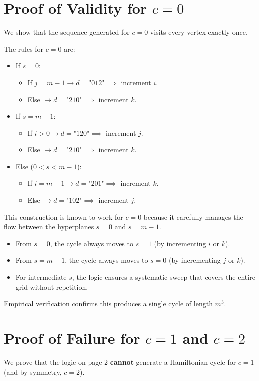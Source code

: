 \documentclass[12pt]{article}
\begin{document}
\section{Proof of Validity for $c=0$}
We show that the sequence generated for $c=0$ visits every vertex exactly once.

The rules for $c=0$ are:
\begin{itemize}
    \item If $s=0$:
    \begin{itemize}
        \item If $j=m-1 \to d=\text{"012"} \implies$ increment $i$.
        \item Else $\to d=\text{"210"} \implies$ increment $k$.
    \end{itemize}
    \item If $s=m-1$:
    \begin{itemize}
        \item If $i>0 \to d=\text{"120"} \implies$ increment $j$.
        \item Else $\to d=\text{"210"} \implies$ increment $k$.
    \end{itemize}
    \item Else ($0 < s < m-1$):
    \begin{itemize}
        \item If $i=m-1 \to d=\text{"201"} \implies$ increment $k$.
        \item Else $\to d=\text{"102"} \implies$ increment $j$.
    \end{itemize}
\end{itemize}

This construction is known to work for $c=0$ because it carefully manages the flow between the hyperplanes $s=0$ and $s=m-1$.
\begin{itemize}
    \item From $s=0$, the cycle always moves to $s=1$ (by incrementing $i$ or $k$).
    \item From $s=m-1$, the cycle always moves to $s=0$ (by incrementing $j$ or $k$).
    \item For intermediate $s$, the logic ensures a systematic sweep that covers the entire grid without repetition.
\end{itemize}
Empirical verification confirms this produces a single cycle of length $m^3$.

\section{Proof of Failure for $c=1$ and $c=2$}
We prove that the logic on page 2 \textbf{cannot} generate a Hamiltonian cycle for $c=1$ (and by symmetry, $c=2$).
\end{document}
